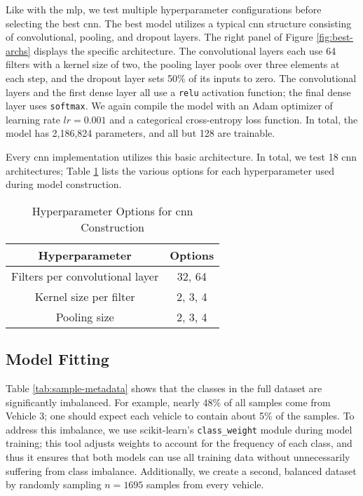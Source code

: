\documentclass[../main.tex]{subfiles}
\begin{document}

Like with the \ac{mlp}, we test multiple hyperparameter configurations before selecting the best \ac{cnn}. The best model utilizes a typical \ac{cnn} structure consisting of convolutional, pooling, and dropout layers. The right panel of Figure \ref{fig:best-archs} displays the specific architecture. The convolutional layers each use 64 filters with a kernel size of two, the pooling layer pools over three elements at each step, and the dropout layer sets 50\% of its inputs to zero. The convolutional layers and the first dense layer all use a \texttt{relu} activation function; the final dense layer uses \texttt{softmax}. We again compile the model with an Adam optimizer of learning rate $lr = 0.001$ and a categorical cross-entropy loss function. In total, the model has 2,186,824 parameters, and all but 128 are trainable.

Every \ac{cnn} implementation utilizes this basic architecture. In total, we test 18 \ac{cnn} architectures; Table \ref{tab:cnn-archs} lists the various options for each hyperparameter used during model construction.

\begin{table}
    \caption{Hyperparameter Options for \ac{cnn} Construction}
    \centering
    \label{tab:cnn-archs}
    \begin{tabular}{|c|c|}
    \hline
    \textbf{Hyperparameter} & \textbf{Options} \\
    \hline
    Filters per convolutional layer & 32, 64  \\
    Kernel size per filter          & 2, 3, 4 \\
    Pooling size                    & 2, 3, 4 \\
    \hline
    \end{tabular}
\end{table}

\subsection{Model Fitting}\label{sec:model-fitting}


Table \ref{tab:sample-metadata} shows that the classes in the full dataset are significantly imbalanced. For example, nearly 48\% of all samples come from Vehicle 3; one should expect each vehicle to contain about 5\% of the samples. To address this imbalance, we use scikit-learn's \texttt{class\_weight} module during model training; this tool adjusts weights to account for the frequency of each class, and thus it ensures that both models can use all training data without unnecessarily suffering from class imbalance. Additionally, we create a second, balanced dataset by randomly sampling $n = 1695$ samples from every vehicle.
\end{document}
